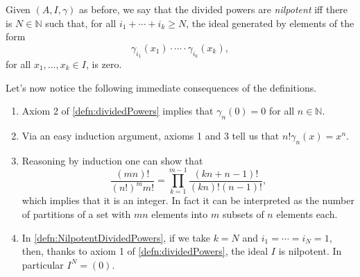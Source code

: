 \begin{defn}\label{defn:NilpotentDividedPowers}
	Given $\left(A, I, \gamma\right)$ as before, we say that the divided
	powers are \emph{nilpotent} iff there is $N \in \mathbb{N}$ such that,
	for all $i_1 + \cdots + i_k \geq N$,
	the ideal generated by elements of the form
	\begin{equation*}
		\gamma_{i_1}(x_1) \cdot \cdots \cdot \gamma_{i_k}(x_k)
	,\end{equation*}
	for all $x_1, \ldots, x_k \in I$,
	is zero.
\end{defn}


\begin{rem}[]
	Let's now notice the following immediate consequences of the definitions.
\begin{enumerate}
\item Axiom 2 of \cref{defn:dividedPowers}
	implies that $\gamma_n(0) = 0$ for all $n \in \mathbb{N}$.

\item Via an easy induction argument, axioms 1 and 3 tell us that
	$n! \gamma_n(x) = x^n$.

\item Reasoning by induction one can show that
	\begin{equation*}
		\frac{\left( mn \right)!}{\left( n! \right)^m m!} =
		\prod_{k=1}^{m-1} \frac{\left( kn + n - 1 \right)!}{(kn)! (n-1)!}
	,\end{equation*}
	which implies that it is an integer.
	In fact it can be interpreted as the number of partitions of a set with $mn$
	elements into $m$ subsets of $n$ elements each.

\item In \cref{defn:NilpotentDividedPowers},
	if we take $k = N$ and $i_1 = \cdots = i_N = 1$,
	then, thanks to axiom 1 of \cref{defn:dividedPowers}, the ideal $I$
	is nilpotent.
	In particular $I^N = (0)$.
\end{enumerate}
\end{rem}


